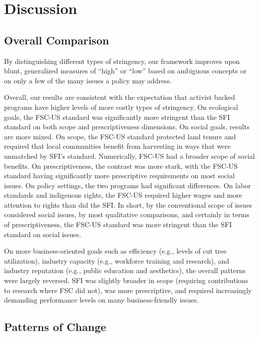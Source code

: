 \documentclass[
      12pt,
            Review ]{article}
\begin{document}
\hypertarget{discussion}{%
\section{Discussion}\label{discussion}}

\hypertarget{overall-comparison}{%
\subsection{Overall Comparison}\label{overall-comparison}}

By distinguishing different types of stringency, our framework improves upon blunt, generalized measures of ``high'' or ``low'' based on ambiguous concepts or on only a few of the many issues a policy may address.

Overall, our results are consistent with the expectation that activist backed programs have higher levels of more costly types of stringency. On ecological goals, the FSC-US standard was significantly more stringent than the SFI standard on both scope and prescriptiveness dimensions. On social goals, results are more mixed. On scope, the FSC-US standard protected land tenure and required that local communities benefit from harvesting in ways that were unmatched by SFI's standard. Numerically, FSC-US had a broader scope of social benefits. On prescriptiveness, the contrast was more stark, with the FSC-US standard having significantly more prescriptive requirements on most social issues. On policy settings, the two programs had significant differences. On labor standards and indigenous rights, the FSC-US required higher wages and more attention to rights than did the SFI. In short, by the conventional scope of issues considered social issues, by most qualitative comparisons, and certainly in terms of prescriptiveness, the FSC-US standard was more stringent than the SFI standard on social issues.

On more business-oriented goals such as efficiency (e.g., levels of cut tree utilization), industry capacity (e.g., workforce training and research), and industry reputation (e.g., public education and aesthetics), the overall patterns were largely reversed. SFI was slightly broader in scope (requiring contributions to research where FSC did not), was more prescriptive, and required increasingly demanding performance levels on many business-friendly issues.

\hypertarget{patterns-of-change}{%
\subsection{Patterns of Change}\label{patterns-of-change}}
\end{document}
